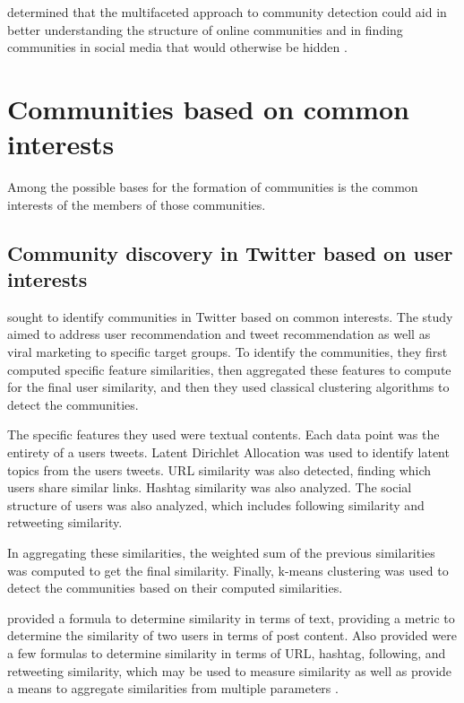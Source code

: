  determined that the multifaceted approach to community detection could aid in better understanding the structure of online communities and in finding communities in social media that would otherwise be hidden \cite{Darmon:2015}.


\section{Communities based on common interests}


Among the possible bases for the formation of communities is the common interests of the members of those communities.


\subsection{Community discovery in Twitter based on user interests}


 sought to identify communities in Twitter based on common interests. The study aimed to address user recommendation and tweet recommendation as well as viral marketing to specific target groups. To identify the communities, they first computed specific feature similarities, then aggregated these features to compute for the final user similarity, and then they used classical clustering algorithms to detect the communities.


The specific features they used were textual contents. Each data point was the entirety of a user\vtick s tweets. Latent Dirichlet Allocation was used to identify latent topics from the user\vtick s tweets. URL similarity was also detected, finding which users share similar links. Hashtag similarity was also analyzed. The social structure of users was also analyzed, which includes following similarity and retweeting similarity. 


In aggregating these similarities, the weighted sum of the previous similarities was computed to get the final similarity. Finally, k-means clustering was used to detect the communities based on their computed similarities. 


 provided a formula to determine similarity in terms of text, providing a metric to determine the similarity of two users in terms of post content. Also provided were a few formulas to determine similarity in terms of URL, hashtag, following, and retweeting similarity, which may be used to measure similarity as well as provide a means to aggregate similarities from multiple parameters \cite{Zhang:2012}. 


